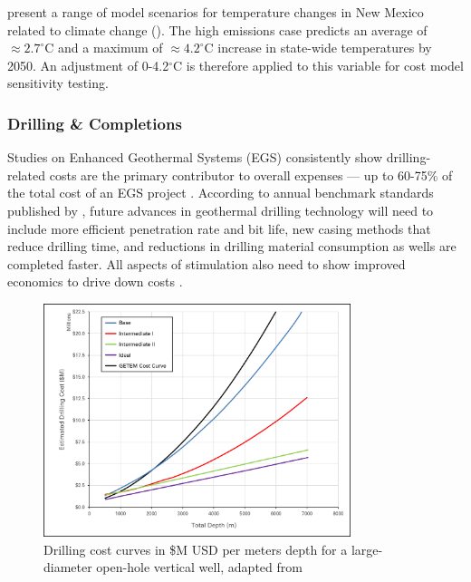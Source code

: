 \citeauthor{frankson_new_2019} present a range of model scenarios for temperature changes in New Mexico related to climate change (\citeyear[Fig.\ 1]{frankson_new_2019}). The high emissions case predicts an average of $\approx 2.7^\circ$C and a maximum of $\approx 4.2^\circ$C increase in state-wide temperatures by 2050. An adjustment of 0-4.2$^\circ$C is therefore applied to this variable for cost model sensitivity testing.

\subsubsection{Drilling \& Completions}
\label{ch4:uncert_dc}

Studies on Enhanced Geothermal Systems (EGS) consistently show drilling-related costs are the primary contributor to overall expenses --- up to 60-75\% of the total cost of an EGS project \citep{lukawski_uncertainty_2016}. According to annual benchmark standards published by \citet{nrel_2020_2020}, future advances in geothermal drilling technology will need to include more efficient penetration rate and bit life, new casing methods that reduce drilling time, and reductions in drilling material consumption as wells are completed faster. All aspects of stimulation also need to show improved economics to drive down costs \citep{nrel_2020_2020}.

\begin{figure}[!htp]
\centering
\includegraphics[width=0.8\textwidth]{templates/images/Figure-Drilling_Cost_Curves.png}
\singlespacing
\caption[GeoVision drilling cost curves]{Drilling cost curves in \$M USD per meters depth for a large-diameter open-hole vertical well, adapted from \citep[Fig.\ 8]{augustine_geovision_2019}}
\label{fig:drill_cost_curves}
\end{figure}

